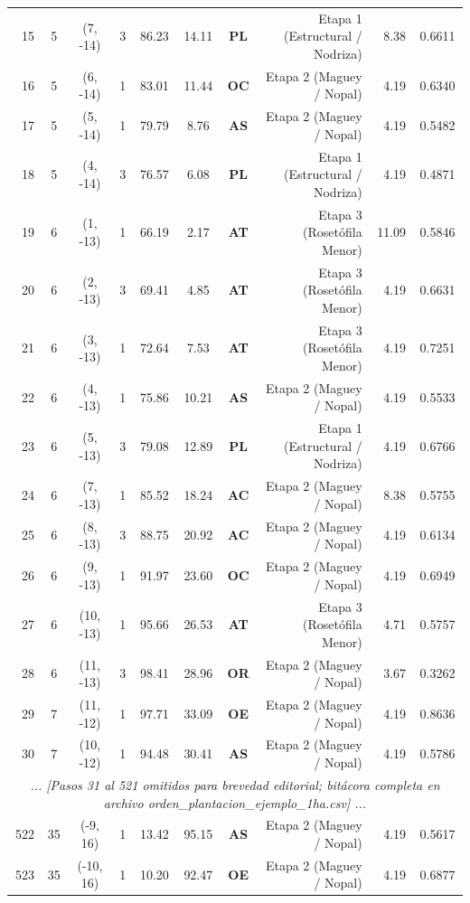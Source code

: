 \documentclass[11pt,a4paper]{article}
\begin{document}
\begin{table}[H]
{\begin{tabular}{rccccccrrc}
15 & 5 & (7, -14) & 3 & 86.23 & 14.11 & \textbf{PL} & Etapa 1 (Estructural / Nodriza) & 8.38 & 0.6611 \\
16 & 5 & (6, -14) & 1 & 83.01 & 11.44 & \textbf{OC} & Etapa 2 (Maguey / Nopal) & 4.19 & 0.6340 \\
17 & 5 & (5, -14) & 1 & 79.79 & 8.76 & \textbf{AS} & Etapa 2 (Maguey / Nopal) & 4.19 & 0.5482 \\
18 & 5 & (4, -14) & 3 & 76.57 & 6.08 & \textbf{PL} & Etapa 1 (Estructural / Nodriza) & 4.19 & 0.4871 \\
19 & 6 & (1, -13) & 1 & 66.19 & 2.17 & \textbf{AT} & Etapa 3 (Rosetófila Menor) & 11.09 & 0.5846 \\
20 & 6 & (2, -13) & 3 & 69.41 & 4.85 & \textbf{AT} & Etapa 3 (Rosetófila Menor) & 4.19 & 0.6631 \\
21 & 6 & (3, -13) & 1 & 72.64 & 7.53 & \textbf{AT} & Etapa 3 (Rosetófila Menor) & 4.19 & 0.7251 \\
22 & 6 & (4, -13) & 1 & 75.86 & 10.21 & \textbf{AS} & Etapa 2 (Maguey / Nopal) & 4.19 & 0.5533 \\
23 & 6 & (5, -13) & 3 & 79.08 & 12.89 & \textbf{PL} & Etapa 1 (Estructural / Nodriza) & 4.19 & 0.6766 \\
24 & 6 & (7, -13) & 1 & 85.52 & 18.24 & \textbf{AC} & Etapa 2 (Maguey / Nopal) & 8.38 & 0.5755 \\
25 & 6 & (8, -13) & 3 & 88.75 & 20.92 & \textbf{AC} & Etapa 2 (Maguey / Nopal) & 4.19 & 0.6134 \\
26 & 6 & (9, -13) & 1 & 91.97 & 23.60 & \textbf{OC} & Etapa 2 (Maguey / Nopal) & 4.19 & 0.6949 \\
27 & 6 & (10, -13) & 1 & 95.66 & 26.53 & \textbf{AT} & Etapa 3 (Rosetófila Menor) & 4.71 & 0.5757 \\
28 & 6 & (11, -13) & 3 & 98.41 & 28.96 & \textbf{OR} & Etapa 2 (Maguey / Nopal) & 3.67 & 0.3262 \\
29 & 7 & (11, -12) & 1 & 97.71 & 33.09 & \textbf{OE} & Etapa 2 (Maguey / Nopal) & 4.19 & 0.8636 \\
30 & 7 & (10, -12) & 1 & 94.48 & 30.41 & \textbf{AS} & Etapa 2 (Maguey / Nopal) & 4.19 & 0.5786 \\
\midrule
\multicolumn{10}{c}{\textit{... [Pasos 31 al 521 omitidos para brevedad editorial; bitácora completa en archivo orden\_plantacion\_ejemplo\_1ha.csv] ...}} \\
\midrule
522 & 35 & (-9, 16) & 1 & 13.42 & 95.15 & \textbf{AS} & Etapa 2 (Maguey / Nopal) & 4.19 & 0.5617 \\
523 & 35 & (-10, 16) & 1 & 10.20 & 92.47 & \textbf{OE} & Etapa 2 (Maguey / Nopal) & 4.19 & 0.6877 \\

\end{tabular}}
\end{table}
\end{document}
